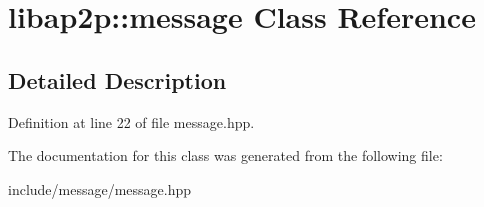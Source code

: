 \hypertarget{classlibap2p_1_1message}{\section{libap2p\-:\-:message Class Reference}
\label{classlibap2p_1_1message}
}


\subsection{Detailed Description}


Definition at line 22 of file message.\-hpp.



The documentation for this class was generated from the following file\-:\begin{DoxyCompactItemize}
\item 
include/message/message.\-hpp\end{DoxyCompactItemize}
